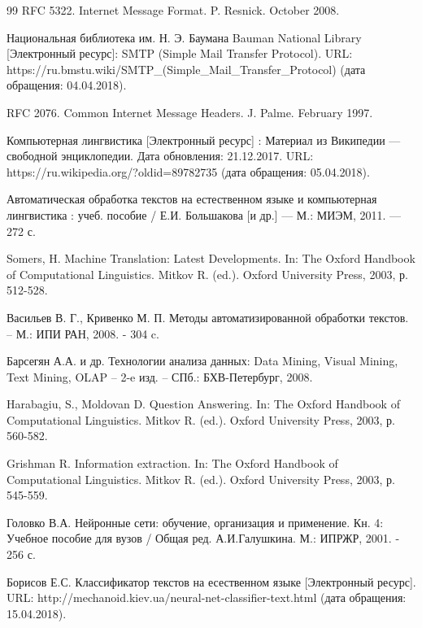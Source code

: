 %

\begin {thebibliography} {99}
RFC 5322. Internet Message Format. P. Resnick. October 2008.

Национальная библиотека им. Н. Э. Баумана Bauman National Library [Электронный ресурс]: SMTP (Simple Mail Transfer Protocol). URL: https://ru.bmstu.wiki/SMTP\_(Simple\_Mail\_Transfer\_Protocol) (дата обращения: 04.04.2018).

RFC 2076. Common Internet Message Headers. J. Palme. February 1997.

Компьютерная лингвистика [Электронный ресурс] : Материал из Википедии — свободной энциклопедии. Дата обновления: 21.12.2017. URL: https://ru.wikipedia.org/?oldid=89782735 (дата обращения: 05.04.2018).

Автоматическая обработка текстов на естественном языке и компьютерная лингвистика : учеб. пособие / Е.И. Большакова [и др.] — М.: МИЭМ, 2011. — 272 с.

Somers, H. Machine Translation: Latest Developments. In: The Oxford Handbook of
Computational Linguistics. Mitkov R. (ed.). Oxford University Press, 2003, р. 512-528.

Васильев В. Г., Кривенко М. П. Методы автоматизированной обработки текстов. – М.: ИПИ РАН, 2008. - 304 c.

Барсегян А.А. и др. Технологии анализа данных: Data Mining, Visual Mining, Text Mining, OLAP – 2-e изд. – СПб.: БХВ-Петербург, 2008.

Harabagiu, S., Moldovan D. Question Answering. In: The Oxford Handbook of
Computational Linguistics. Mitkov R. (ed.). Oxford University Press, 2003, р. 560-582.

Grishman R. Information extraction. In: The Oxford Handbook of Computational
Linguistics. Mitkov R. (ed.). Oxford University Press, 2003, р. 545-559.

Головко В.А. Нейронные сети: обучение, организация и применение. Кн. 4: Учебное пособие для вузов / Общая ред. А.И.Галушкина. М.: ИПРЖР, 2001. - 256 с.

\newpage
{}
Борисов Е.С. Классификатор текстов на есественном языке [Электронный ресурс]. URL: http://mechanoid.kiev.ua/neural-net-classifier-text.html (дата обращения: 15.04.2018).


\end{thebibliography}
